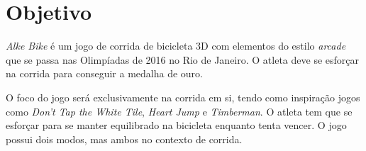 \section{Objetivo} 

\textit{Alke Bike} é um jogo de corrida de bicicleta 3D com elementos do estilo \textit{arcade} que se passa nas Olimpíadas de 2016 no Rio de Janeiro. O atleta deve se esforçar na corrida para conseguir a medalha de ouro.

O foco do jogo será exclusivamente na corrida em si, tendo como inspiração jogos como \textit{Don't Tap the White Tile}, \textit{Heart Jump} e \textit{Timberman}. O atleta tem que se esforçar para se manter equilibrado na bicicleta enquanto tenta vencer. O jogo possui dois modos, mas ambos no contexto de corrida.
